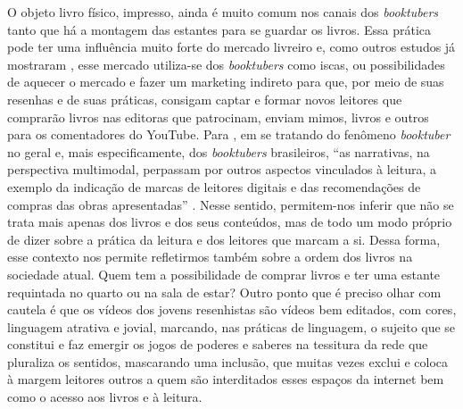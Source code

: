 O objeto livro físico, impresso, ainda é muito comum nos canais dos \textit{booktubers} tanto que há a montagem das estantes para se guardar os livros. Essa prática pode ter uma influência muito forte do mercado livreiro e, como outros estudos já mostraram \cite{costa2018booktubers,aguiar2017critica}, esse mercado utiliza-se dos \textit{booktubers} como iscas, ou possibilidades de aquecer o mercado e fazer um marketing indireto para que, por meio de suas resenhas e de suas práticas, consigam captar e formar novos leitores que comprarão livros nas editoras que patrocinam, enviam mimos, livros e outros para os comentadores do YouTube. Para \textcite{fialho2023booktubers}, em se tratando do fenômeno \textit{booktuber} no geral e, mais especificamente, dos \textit{booktubers} brasileiros, “as narrativas, na perspectiva multimodal, perpassam por outros aspectos vinculados à leitura, a exemplo da indicação de marcas de leitores digitais e das recomendações de compras das obras apresentadas” \cite[p. 12]{fialho2023booktubers}. Nesse sentido, permitem-nos inferir que não se trata mais apenas dos livros e dos seus conteúdos, mas de todo um modo próprio de dizer sobre a prática da leitura e dos leitores que marcam a si. Dessa forma, esse contexto nos permite refletirmos também sobre a ordem dos livros na sociedade atual. Quem tem a possibilidade de comprar livros e ter uma estante requintada no quarto ou na sala de estar? Outro ponto que é preciso olhar com cautela é que os vídeos dos jovens resenhistas são vídeos bem editados, com cores, linguagem atrativa e jovial, marcando, nas práticas de linguagem, o sujeito que se constitui e faz emergir os jogos de poderes e saberes na tessitura da rede que pluraliza os sentidos, mascarando uma inclusão, que muitas vezes exclui e coloca à margem leitores outros a quem são interditados esses espaços da internet bem como o acesso aos livros e à leitura. 


